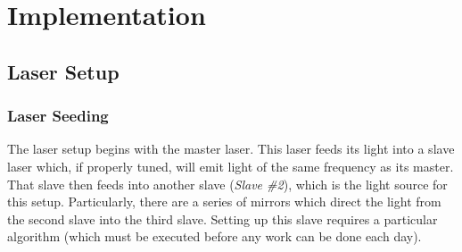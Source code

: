 \newpage
\section{Implementation}
\label{sec:implementation}

\subsection{Laser Setup}

    \subsubsection{Laser Seeding}

The laser setup begins with the master laser.  This laser feeds its light into a slave laser which, if properly tuned, will emit light of the same frequency as its master. That slave then feeds into another slave (\emph{Slave \#2}), which is the light source for this setup.  Particularly, there are a series of mirrors which direct the light from the second slave into the third slave.  Setting up this slave requires a particular algorithm (which must be executed before any work can be done each day). \\

